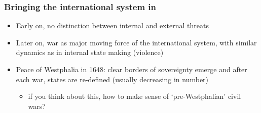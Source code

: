 \documentclass[aspectratio=43, handout]{beamer}
\begin{document}
\begin{frame}
\frametitle{Bringing the international system in}
\centering

\begin{itemize}
  \item Early on, no distinction between internal and external threats
  \item Later on, war as major moving force of the international system, with similar dynamics as in internal state making (violence)
  \item Peace of Westphalia in 1648: clear borders of sovereignty emerge and after each war, states are re-defined (usually decreasing in number)
  \begin{itemize}
    \item if you think about this, how to make sense of `pre-Westphalian' civil wars?
  \end{itemize}
\end{itemize}

\end{frame}

%
%

%
%
\end{document}
